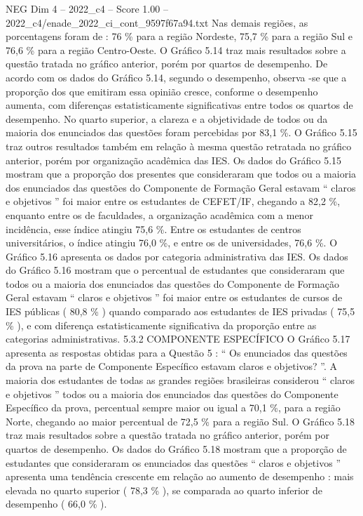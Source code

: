 \begin{textsample}{NEG Dim 4 – 2022\_c4 – Score 1.00 – 2022\_c4/enade\_2022\_ci\_cont\_9597f67a94.txt}
Nas demais regiões, as porcentagens foram de : 76 \% para a região Nordeste, 75,7 \% para a região Sul e 76,6 \% para a região Centro-Oeste.
O Gráfico 5.14 traz mais resultados sobre a questão tratada no gráfico anterior, porém por quartos de desempenho.
De acordo com os dados do Gráfico 5.14, segundo o desempenho, observa -se que a proporção dos que emitiram essa opinião cresce, conforme o desempenho aumenta, com diferenças estatisticamente significativas entre todos os quartos de desempenho.
No quarto superior, a clareza e a objetividade de todos ou da maioria dos enunciados das questões foram percebidas por 83,1 \%.
O Gráfico 5.15 traz outros resultados também em relação à mesma questão retratada no gráfico anterior, porém por organização acadêmica das IES.
Os dados do Gráfico 5.15 mostram que a proporção dos presentes que consideraram que todos ou a maioria dos enunciados das questões do Componente de Formação Geral estavam “ claros e objetivos ” foi maior entre os estudantes de CEFET/IF, chegando a 82,2 \%, enquanto entre os de faculdades, a organização acadêmica com a menor incidência, esse índice atingiu 75,6 \%.
Entre os estudantes de centros universitários, o índice atingiu 76,0 \%, e entre os de universidades, 76,6 \%.
O Gráfico 5.16 apresenta os dados por categoria administrativa das IES.
Os dados do Gráfico 5.16 mostram que o percentual de estudantes que consideraram que todos ou a maioria dos enunciados das questões do Componente de Formação Geral estavam “ claros e objetivos ” foi maior entre os estudantes de cursos de IES públicas ( 80,8 \% ) quando comparado aos estudantes de IES privadas ( 75,5 \% ), e com diferença estatisticamente significativa da proporção entre as categorias administrativas. 5.3.2 COMPONENTE ESPECÍFICO O Gráfico 5.17 apresenta as respostas obtidas para a Questão 5 : “ Os enunciados das questões da prova na parte de Componente Específico estavam claros e objetivos? ”.
A maioria dos estudantes de todas as grandes regiões brasileiras considerou “ claros e objetivos ” todos ou a maioria dos enunciados das questões do Componente Específico da prova, percentual sempre maior ou igual a 70,1 \%, para a região Norte, chegando ao maior percentual de 72,5 \% para a região Sul.
O Gráfico 5.18 traz mais resultados sobre a questão tratada no gráfico anterior, porém por quartos de desempenho.
Os dados do Gráfico 5.18 mostram que a proporção de estudantes que consideraram os enunciados das questões “ claros e objetivos ” apresenta uma tendência crescente em relação ao aumento de desempenho : mais elevada no quarto superior ( 78,3 \% ), se comparada ao quarto inferior de desempenho ( 66,0 \% ).

\end{textsample}
